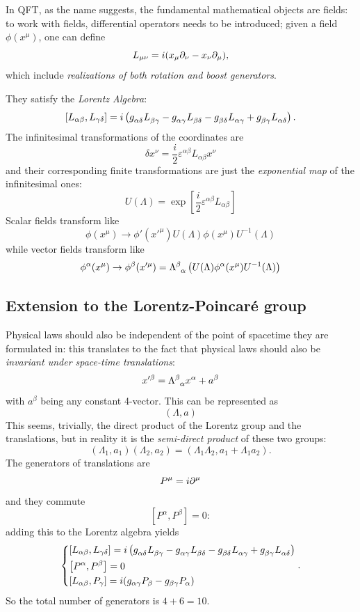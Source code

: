 In QFT, as the name suggests, the fundamental mathematical objects are fields:
to work with fields, differential operators needs to be introduced;
given a field $\phi(x^\mu)$, one can define
\[
    L_{\mu\nu} = i (x_\mu\partial_\nu-x_\nu\partial_\mu),
\]
which include \textit{realizations of both rotation and boost generators}.

They satisfy the \textit{Lorentz Algebra}:
\[
    \left[L_{\alpha\beta},L_{\gamma\delta}\right] = i\left(
    g\indices{_\alpha_\delta}L\indices{_\beta_\gamma}
    - g\indices{_\alpha_\gamma}L\indices{_\beta_\delta}
    - g\indices{_\beta_\delta} L\indices{_\alpha_\gamma} +
    g\indices{_\beta_\gamma} L\indices{_\alpha_\delta}\right).
\]
The infinitesimal transformations of the coordinates are
\[
    \delta x^\nu = \frac{i}{2}\varepsilon^{\alpha\beta}L_{\alpha\beta}x^\nu
\]
and their corresponding finite transformations are just the \textit{exponential
map} of the infinitesimal ones:
\[
    U(\Lambda) = \exp\left[ \frac{i}{2}\varepsilon^{\alpha\beta}L_{\alpha\beta}
    \right]
\]
Scalar fields transform like
\[
    \phi(x^\mu)\to \phi'(x'^\mu)U(\Lambda)\phi(x^\mu)U^{-1}(\Lambda)
\]
while vector fields transform like
\[
    \phi^\alpha(x^\mu) \to \phi^\beta(x'^\mu) = \Lambda\indices{^\beta_\alpha}
    \left(U(\Lambda)\phi^\alpha(x^\mu)U^{-1}(\Lambda)\right)
\]
\subsection{Extension to the Lorentz-Poincaré group}
Physical laws should also be independent of the point of spacetime
they are formulated in: this translates to the fact that physical laws
should also be \textit{invariant under space-time translations}:
\[
    x'^\beta = \Lambda\indices{^\beta_\alpha}x^\alpha + a^\beta
\]
with $a^\beta$ being any constant 4-vector. This can be represented as
\[
    (\Lambda,a)
\]
This seems, trivially, the direct
product of the Lorentz group and the translations, but in reality it is
the \textit{semi-direct product} of these two groups:
\[
    (\Lambda_1,a_1)(\Lambda_2,a_2) = (\Lambda_1\Lambda_2,a_1+\Lambda_1a_2).
\]
The generators of translations are
\[
    P^\mu = i\partial^\mu
\]
and they commute
\[
    \left[P^\alpha,P^\beta\right]=0:
\]
adding this to the Lorentz algebra yields
\[
    \begin{dcases*}
        \left[L_{\alpha\beta},L_{\gamma\delta}\right] = i\left(
        g\indices{_\alpha_\delta}L\indices{_\beta_\gamma}
        - g\indices{_\alpha_\gamma}L\indices{_\beta_\delta}
        - g\indices{_\beta_\delta} L\indices{_\alpha_\gamma} +
        g\indices{_\beta_\gamma} L\indices{_\alpha_\delta}\right)\\
        \left[P^\alpha,P^{\beta}\right]=0\\
        \left[L_{\alpha\beta},P_{\gamma}\right] = i (g_{\alpha\gamma} P_\beta
        - g_{\beta\gamma} P_\alpha)
    \end{dcases*}.
\]
So the total number of generators is $4+6=10$.

